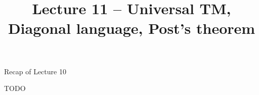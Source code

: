 \documentclass[handout]{beamer}
\title{Lecture 11 -- Universal TM, Diagonal language, Post’s theorem}
\begin{document}
\frame{\titlepage}


\begin{frame}{Recap of Lecture 10}
	
    TODO
	
\end{frame}
\end{document}
